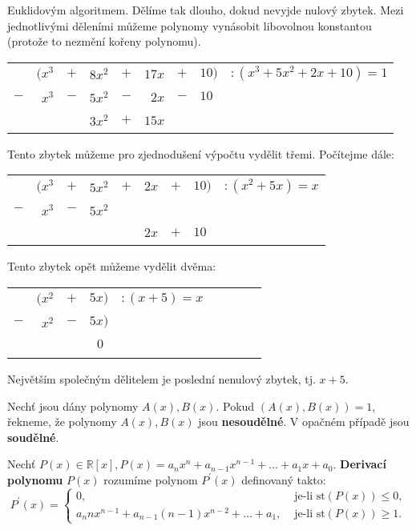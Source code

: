 \begin{reseni}
Euklidovým algoritmem. Dělíme tak dlouho, dokud nevyjde nulový zbytek.
Mezi jednotlivými děleními můžeme polynomy vynásobit libovolnou konstantou (protože
to nezmění kořeny polynomu).
\setlength{\tabcolsep}{2pt}
\begin{center}
	\begin{tabular}{rrrrrrrrl}
	    \,  & $(x^3$ & $+$ & $8x^2$ & $+$ & $17x$ & $+$ & $10)$ & $:(x^3+5x^2+2x+10)=1$ \\
		$-$ & $x^3$  & $-$ & $5x^2$ & $-$ & $2x$  & $-$ & $10\phantom{)}$	& \, \\
		\hline
		\,  & \,     & \,  & $3x^2$ & $+$ & $15x$ & \,  & \,                & \,
	\end{tabular}
\end{center}
Tento zbytek můžeme pro zjednodušení výpočtu vydělit třemi. Počítejme dále:
\begin{center}
	\begin{tabular}{rrrrrrrrl}
	    \,  & $(x^3$ & $+$ & $5x^2$ & $+$ & $2x$ & $+$ & $10)$ & $:(x^2+5x)=x$ \\
		$-$ & $x^3$  & $-$ & $5x^2$ & \,  & \,   & \,  & \,    & \, \\
		\hline
		\,  & \,     & \,  & \,     & \,  & $2x$ & $+$ & $10\phantom{)}$ & \,
	\end{tabular}
\end{center}
Tento zbytek opět můžeme vydělit dvěma:
\begin{center}
	\begin{tabular}{rrrrrrrrl}
	    \,  & $(x^2$ & $+$ & $5x)$ & $:(x+5)=x$ \\
		$-$ & $x^2$  & $-$ & $5x)$ & \,  \\
		\hline
		\,  & \,     &   \,& $0\phantom{)}$     & \,
	\end{tabular}
\end{center}
Největším společným dělitelem je poslední nenulový zbytek, tj. $x+5$.
\end{reseni}

\begin{definition}
  Nechť jsou dány polynomy $A(x), B(x)$. Pokud $(A(x), B(x)) = 1$, řekneme, že polynomy $A(x), B(x)$ jsou \textbf{nesoudělné}. V opačném případě jsou \textbf{soudělné}.
\end{definition}

\begin{definition}
    Nechť $P(x) \in \mathbb R[x], P(x)=a_nx^n+a_{n-1}x^{n-1}+\dots+a_1x+a_0.$ \textbf{Derivací polynomu} $P(x)$ rozumíme polynom $P^\prime(x)$ definovaný takto:
    $$
        P^\prime(x)=\begin{cases}
        0, &\text{ je-li st} (P(x)) \leq 0,\\
        a_n n x^{n-1} + a_{n-1}(n-1)x^{n-2} + \dots + a_1, & \text{ je-li st} (P(x)) \geq 1.
        \end{cases}
    $$
\end{definition}


